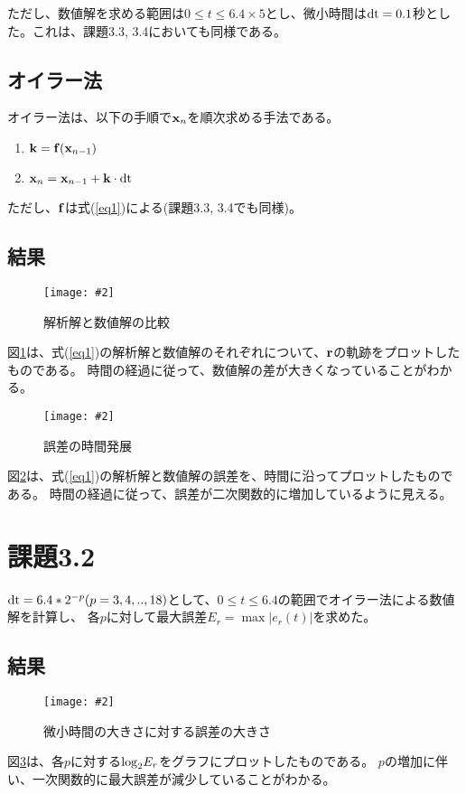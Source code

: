 \documentclass[11pt]{jsarticle}
\newcommand{\fg}[3]{ %
    \begin{figure}
        \texttt{[image: \#2]}
        \caption{#3}
        \label{#1}
    \end{figure}
}
\newcommand{\fr}[1]{図\ref{#1}}
\newcommand{\er}[1]{式(\ref{#1})}
\newcommand{\kb}{{\bf k}}
\newcommand{\xb}{{\bf x}}
\newcommand{\fb}{{\bf f}}
\newcommand{\dtn}{{\rm dt}}
\begin{document}
        ただし、数値解を求める範囲は$0 \leq t \leq 6.4 \times 5$とし、微小時間は${\rm dt} = 0.1$秒とした。これは、課題3.3, 3.4においても同様である。

        \subsection{オイラー法}
            オイラー法は、以下の手順で${\bf x}_{n}$を順次求める手法である。

            \begin{enumerate}
                \item $\kb = \fb(\xb_{n-1})$
                \item $\xb_{n} = \xb_{n-1} + \kb \cdot \dtn$
            \end{enumerate}

            ただし、${\bf f}$は\er{eq1}による(課題3.3, 3.4でも同様)。
        
        \subsection{結果}
            \fg{fig1}{graphs/euler/rc_ra.eps}{解析解と数値解の比較} 

            \fr{fig1}は、\er{eq1}の解析解と数値解のそれぞれについて、${\bf r}$の軌跡をプロットしたものである。
            時間の経過に従って、数値解の差が大きくなっていることがわかる。

            \fg{fig2}{graphs/euler/error_by_time.eps}{誤差の時間発展}

            \fr{fig2}は、\er{eq1}の解析解と数値解の誤差を、時間に沿ってプロットしたものである。
            時間の経過に従って、誤差が二次関数的に増加しているように見える。

    \section{課題3.2}
        ${\rm dt} = 6.4 * 2^{-p} (p = 3,4,..,18)$として、$0 \leq t \leq 6.4$の範囲でオイラー法による数値解を計算し、
        各$p$に対して最大誤差$E_r = \max|e_r(t)|$を求めた。

        \subsection{結果}
            \fg{fig3}{graphs/euler/error_by_p.eps}{微小時間の大きさに対する誤差の大きさ}

            \fr{fig3}は、各$p$に対する${\rm log}_2E_r$をグラフにプロットしたものである。
            $p$の増加に伴い、一次関数的に最大誤差が減少していることがわかる。
\end{document}
